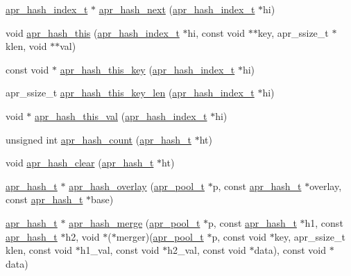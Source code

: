 \begin{DoxyCompactItemize}
\item 
\hyperlink{group__apr__hash_ga3b3d353989f6cea4535630634be147f7}{apr\-\_\-hash\-\_\-index\-\_\-t} $\ast$ \hyperlink{group__apr__hash_ga9d7b9198555659e9abac4e3028ccce00}{apr\-\_\-hash\-\_\-next} (\hyperlink{group__apr__hash_ga3b3d353989f6cea4535630634be147f7}{apr\-\_\-hash\-\_\-index\-\_\-t} $\ast$hi)
\item 
void \hyperlink{group__apr__hash_gad90e5b895397c2c535e32b3e44a75b3f}{apr\-\_\-hash\-\_\-this} (\hyperlink{group__apr__hash_ga3b3d353989f6cea4535630634be147f7}{apr\-\_\-hash\-\_\-index\-\_\-t} $\ast$hi, const void $\ast$$\ast$key, apr\-\_\-ssize\-\_\-t $\ast$klen, void $\ast$$\ast$val)
\item 
const void $\ast$ \hyperlink{group__apr__hash_ga835bd602131de7d40cbf8abd4e0f9f6c}{apr\-\_\-hash\-\_\-this\-\_\-key} (\hyperlink{group__apr__hash_ga3b3d353989f6cea4535630634be147f7}{apr\-\_\-hash\-\_\-index\-\_\-t} $\ast$hi)
\item 
apr\-\_\-ssize\-\_\-t \hyperlink{group__apr__hash_gae49a862095e9a3ca96603faa69493736}{apr\-\_\-hash\-\_\-this\-\_\-key\-\_\-len} (\hyperlink{group__apr__hash_ga3b3d353989f6cea4535630634be147f7}{apr\-\_\-hash\-\_\-index\-\_\-t} $\ast$hi)
\item 
void $\ast$ \hyperlink{group__apr__hash_gaebf56aa7585e6fa18b6ff9563c71914b}{apr\-\_\-hash\-\_\-this\-\_\-val} (\hyperlink{group__apr__hash_ga3b3d353989f6cea4535630634be147f7}{apr\-\_\-hash\-\_\-index\-\_\-t} $\ast$hi)
\item 
unsigned int \hyperlink{group__apr__hash_ga4e44efa9ef043c1bb8a4abc5edcfda2c}{apr\-\_\-hash\-\_\-count} (\hyperlink{group__apr__hash_ga72ec09b8bde6d874c36bd49df915fff6}{apr\-\_\-hash\-\_\-t} $\ast$ht)
\item 
void \hyperlink{group__apr__hash_ga06fb1b9ecff1a15ee41ff02db74264e4}{apr\-\_\-hash\-\_\-clear} (\hyperlink{group__apr__hash_ga72ec09b8bde6d874c36bd49df915fff6}{apr\-\_\-hash\-\_\-t} $\ast$ht)
\item 
\hyperlink{group__apr__hash_ga72ec09b8bde6d874c36bd49df915fff6}{apr\-\_\-hash\-\_\-t} $\ast$ \hyperlink{group__apr__hash_ga2f68646a64bad44efcbf3457af581fdb}{apr\-\_\-hash\-\_\-overlay} (\hyperlink{group__apr__pools_gaf137f28edcf9a086cd6bc36c20d7cdfb}{apr\-\_\-pool\-\_\-t} $\ast$p, const \hyperlink{group__apr__hash_ga72ec09b8bde6d874c36bd49df915fff6}{apr\-\_\-hash\-\_\-t} $\ast$overlay, const \hyperlink{group__apr__hash_ga72ec09b8bde6d874c36bd49df915fff6}{apr\-\_\-hash\-\_\-t} $\ast$base)
\item 
\hyperlink{group__apr__hash_ga72ec09b8bde6d874c36bd49df915fff6}{apr\-\_\-hash\-\_\-t} $\ast$ \hyperlink{group__apr__hash_gaa954266cd16a55f7f384ab0a9c4ff9f1}{apr\-\_\-hash\-\_\-merge} (\hyperlink{group__apr__pools_gaf137f28edcf9a086cd6bc36c20d7cdfb}{apr\-\_\-pool\-\_\-t} $\ast$p, const \hyperlink{group__apr__hash_ga72ec09b8bde6d874c36bd49df915fff6}{apr\-\_\-hash\-\_\-t} $\ast$h1, const \hyperlink{group__apr__hash_ga72ec09b8bde6d874c36bd49df915fff6}{apr\-\_\-hash\-\_\-t} $\ast$h2, void $\ast$($\ast$merger)(\hyperlink{group__apr__pools_gaf137f28edcf9a086cd6bc36c20d7cdfb}{apr\-\_\-pool\-\_\-t} $\ast$p, const void $\ast$key, apr\-\_\-ssize\-\_\-t klen, const void $\ast$h1\-\_\-val, const void $\ast$h2\-\_\-val, const void $\ast$data), const void $\ast$data)

\end{DoxyCompactItemize}
